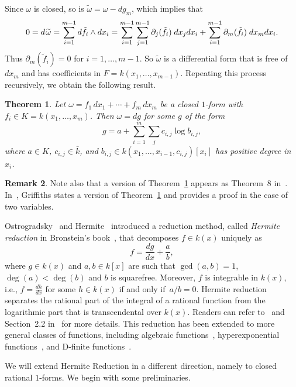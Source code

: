 \documentclass{amsart}
\newtheorem{thm}{Theorem}
\theoremstyle{definition}
\newtheorem{remark}[thm]{Remark}
\numberwithin{equation}{section}
\numberwithin{thm}{section}
\begin{document}
Since $\omega$ is closed, so is $\widetilde{\omega} = \omega - dg_m$, which implies that
\[
0 = d\hskip1pt\widetilde{\omega} = \sum_{i=1}^{m-1} d\tilde{f}_i \wedge dx_i = \sum_{i=1}^{m-1} \sum_{j=1}^{m-1} \partial_j(\tilde{f}_i) \hskip1pt \, dx_j dx_i + \sum_{i=1}^{m-1} \partial_m(\tilde{f}_i) \hskip1pt \, dx_mdx_i .
\]
Thus $\partial_m(\tilde f_i)=0$ for $i=1, \ldots, m-1$. So $\widetilde{\omega}$ is a differential form that is free of $dx_m$ and has coefficients in $F = k(x_1,\dots,x_{m-1})$.  Repeating this process recursively, we obtain the following result.

\begin{thm}
\label{THM:1form}
Let $\omega = f_1\, dx_1 + \cdots + f_m \, dx_m$ be a closed $1$-form with $f_i \in K = k(x_1,\dots,x_m)$. 
Then $\omega = dg$ for some $g$ of the form
\[
g = a + \sum_{i=1}^m \sum_j c_{i,j} \log b_{i,j},
\]
where  $a \in K$, $c_{i,j} \in  \bar k$, and $b_{i,j} \in k(x_1,\ldots,x_{i-1},c_{i,j})[x_i]$ has positive degree in~$x_i$.
\end{thm}

\begin{remark}
Note also that a version of Theorem~\ref{THM:1form} appears as Theorem~8 in~\cite{ChenKoutschan}. In~\cite[(1.5)]{Griffiths1976}, Griffiths states a version of Theorem~\ref{THM:1form} and provides a proof in the case of two variables.
\end{remark}

Ostrogradsky~\cite{Ostrogradsky1845} and Hermite~\cite{Hermite1872} introduced 
a reduction method, called \textit{Hermite reduction} in Bronstein's book~\cite{Bronstein}, that decomposes $f\in k(x)$ uniquely as
\[f = \frac{dg}{dx}+ \frac{a}{b},\]
where $g \in k(x)$ and $a, b\in k[x]$ are such that $\gcd(a, b)=1$, $\deg(a)<\deg(b)$ and $b$ is squarefree. Moreover, $f$ is integrable in $k(x)$, i.e., $f= \frac{dh}{dx}$ for some $h\in k(x)$ if and only if~$a/b=0$. Hermite reduction separates the rational part of the integral of a rational function from  the logarithmic part that is transcendental over $k(x)$. Readers can refer to~\cite{Hermite1872} and Section~2.2 in~\cite{Bronstein} for more details. This reduction has been extended to more general classes of functions, including algebraic functions~\cite{Trager1984,ChenKauersKoutschan2016}, hyperexponential functions~\cite{bostan-chen-chyzak-li-xin}, and D-finite functions~\cite{bostan-chyzak-lairez-salvy, vdH2021, Chen2023}.  

We will extend Hermite Reduction in a different direction, namely to closed rational $1$-forms.  We begin with some preliminaries.
\end{document}
